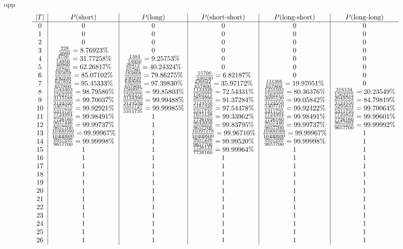 opp
\[
\begin{array}{c| c| c| c| c| c}
|T| & P(\text{short}) & P(\text{long}) & P(\text{short-short}) & P(\text{long-short}) & P(\text{long-long}) \\\hline
0 & 0 & 0 & 0 & 0 & 0\\
1 & 0 & 0 & 0 & 0 & 0\\
2 & 0 & 0 & 0 & 0 & 0\\
3 & \frac{228}{2600} = 8.76923\% & 0 & 0 & 0 & 0\\
4 & \frac{4750}{14950} = 31.77258\% & \frac{1384}{14950} = 9.25753\% & 0 & 0 & 0\\
5 & \frac{40960}{65780} = 62.26817\% & \frac{26472}{65780} = 40.24324\% & 0 & 0 & 0\\
6 & \frac{195859}{230230} = 85.07102\% & \frac{183868}{230230} = 79.86275\% & \frac{15706}{230230} = 6.82187\% & 0 & 0\\
7 & \frac{627892}{657800} = 95.45333\% & \frac{640686}{657800} = 97.39830\% & \frac{236622}{657800} = 35.97172\% & \frac{131366}{657800} = 19.97051\% & 0\\
8 & \frac{1543463}{1562275} = 98.79586\% & \frac{1560057}{1562275} = 99.85803\% & \frac{1133326}{1562275} = 72.54331\% & \frac{1255503}{1562275} = 80.36376\% & \frac{316134}{1562275} = 20.23549\%\\
9 & \frac{3115188}{3124550} = 99.70037\% & \frac{3124390}{3124550} = 99.99488\% & \frac{2854990}{3124550} = 91.37284\% & \frac{3095130}{3124550} = 99.05842\% & \frac{2649562}{3124550} = 84.79819\%\\
10 & \frac{5307975}{5311735} = 99.92921\% & \frac{5311727}{5311735} = 99.99985\% & \frac{5181320}{5311735} = 97.54478\% & \frac{5307710}{5311735} = 99.92422\% & \frac{5295834}{5311735} = 99.70064\%\\
11 & \frac{7724994}{7726160} = 99.98491\% & 1 & \frac{7675138}{7726160} = 99.33962\% & \frac{7724994}{7726160} = 99.98491\% & \frac{7725852}{7726160} = 99.99601\%\\
12 & \frac{9657446}{9657700} = 99.99737\% & 1 & \frac{9642050}{9657700} = 99.83795\% & \frac{9657446}{9657700} = 99.99737\% & \frac{9657692}{9657700} = 99.99992\%\\
13 & \frac{10400566}{10400600} = 99.99967\% & 1 & \frac{10397178}{10400600} = 99.96710\% & \frac{10400566}{10400600} = 99.99967\% & 1\\
14 & \frac{9657698}{9657700} = 99.99998\% & 1 & \frac{9657236}{9657700} = 99.99520\% & \frac{9657698}{9657700} = 99.99998\% & 1\\
15 & 1 & 1 & \frac{7726132}{7726160} = 99.99964\% & 1 & 1\\
16 & 1 & 1 & 1 & 1 & 1\\
17 & 1 & 1 & 1 & 1 & 1\\
18 & 1 & 1 & 1 & 1 & 1\\
19 & 1 & 1 & 1 & 1 & 1\\
20 & 1 & 1 & 1 & 1 & 1\\
21 & 1 & 1 & 1 & 1 & 1\\
22 & 1 & 1 & 1 & 1 & 1\\
23 & 1 & 1 & 1 & 1 & 1\\
24 & 1 & 1 & 1 & 1 & 1\\
25 & 1 & 1 & 1 & 1 & 1\\
26 & 1 & 1 & 1 & 1 & 1\\
\end{array}
\]
